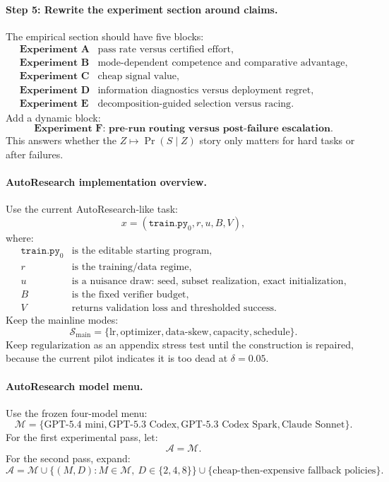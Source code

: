 \documentclass{article}
\begin{document}
\paragraph{Step 5: Rewrite the experiment section around claims.}
The empirical section should have five blocks:
\[
\begin{array}{ll}
    \textbf{Experiment A} & \text{pass rate versus certified effort},\\
    \textbf{Experiment B} & \text{mode-dependent competence and comparative advantage},\\
    \textbf{Experiment C} & \text{cheap signal value},\\
    \textbf{Experiment D} & \text{information diagnostics versus deployment regret},\\
    \textbf{Experiment E} & \text{decomposition-guided selection versus racing}.
\end{array}
\]
Add a dynamic block:
\[
    \textbf{Experiment F: pre-run routing versus post-failure escalation}.
\]
This answers whether the \(Z\mapsto \Pr(S\mid Z)\) story only matters for hard tasks or
after failures.

\paragraph{AutoResearch implementation overview.}
Use the current AutoResearch-like task:
\[
    x=(\texttt{train.py}_0,r,u,B,V),
\]
where:
\[
\begin{array}{ll}
    \texttt{train.py}_0 & \text{is the editable starting program},\\
    r & \text{is the training/data regime},\\
    u & \text{is a nuisance draw: seed, subset realization, exact initialization},\\
    B & \text{is the fixed verifier budget},\\
    V & \text{returns validation loss and thresholded success}.
\end{array}
\]
Keep the mainline modes:
\[
    \mathcal S_{\mathrm{main}}
    =
    \{
    \mathrm{lr},
    \mathrm{optimizer},
    \mathrm{data\text{-}skew},
    \mathrm{capacity},
    \mathrm{schedule}
    \}.
\]
Keep \(\mathrm{regularization}\) as an appendix stress test until the construction is repaired,
because the current pilot indicates it is too dead at \(\delta=0.05\).

\paragraph{AutoResearch model menu.}
Use the frozen four-model menu:
\[
    \mathcal M
    =
    \{
    \text{GPT-5.4 mini},
    \text{GPT-5.3 Codex},
    \text{GPT-5.3 Codex Spark},
    \text{Claude Sonnet}
    \}.
\]
For the first experimental pass, let:
\[
    \mathcal A=\mathcal M.
\]
For the second pass, expand:
\[
    \mathcal A
    =
    \mathcal M
    \cup
    \{(M,D):M\in\mathcal M,\ D\in\{2,4,8\}\}
    \cup
    \{\text{cheap-then-expensive fallback policies}\}.
\]
\end{document}

